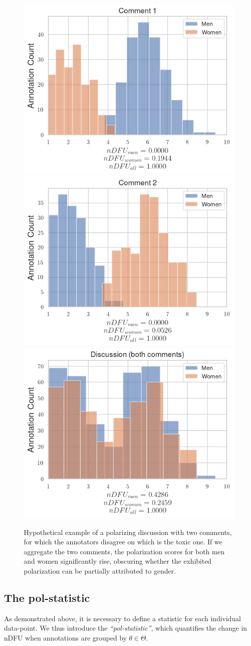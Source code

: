 \documentclass{article}
\begin{document}
\begin{figure}
	\centering
    \includegraphics[width=0.3\linewidth]{ndfu_comment1.png}
    \includegraphics[width=0.3 \linewidth]{ndfu_comment2.png}
	\includegraphics[width=0.3 \linewidth]{ndfu_discussion.png}
	\caption{Hypothetical example of a polarizing discussion with two comments, for which the annotators disagree on which is the toxic one. If we aggregate the two comments, the polarization scores for both men and women significantly rise, obscuring whether the exhibited polarization can be partially attributed to gender. %
    }
	\label{fig:ndfu_multi_data-point}
\end{figure}

 
 
 \subsection{The pol-statistic}
 \label{ssec:methodology:polstat}
  
As demonstrated above, it is necessary to define a statistic for each individual data-point. We thus introduce the \textit{``pol-statistic''}, which quantifies the change in \ac{nDFU} when annotations are grouped by $\theta \in \Theta$.
\end{document}
